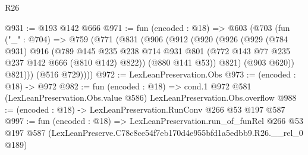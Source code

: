 \begin{lexlean}{R26}
\begin{coremodule}
@931 := @193 @142 @666
@971 := fun (encoded : @18) =>
  @603
    (@703
      (fun ("_" : @704) =>
      @759
        (@771
          (@831
            (@906
              (@912
                (@920
                  (@926
                    (@929
                      (@784 @931)
                      @916
                      (@789
                        @145
                        @235
                        @238
                        @714
                        @931
                        @801
                        (@772 @143 @77 @235 @237 @142 @666 (@810 @142) @822))
                      (@880 @141 @53))
                    @821)
                  (@903 @620))
                @821)))
          (@516 @729))))
@972 := LexLeanPreservation.Obs
@973 := (encoded : @18) -> @972
@982 := fun (encoded : @18) =>
  cond.{1} @972 @581 (LexLeanPreservation.Obs.value @586) LexLeanPreservation.Obs.overflow
@988 := (encoded : @18) -> LexLeanPreservation.RunConv @266 @53 @197 @587
@997 := fun (encoded : @18) =>
  LexLeanPreservation.run_of_funRel
    @266
    @53
    @197
    @587
    (LexLeanPreserve.C78c8ce54f7eb170d4e955bfd1a5edbb9.R26.__rel_0 @189)
\end{coremodule}
\end{lexlean}
